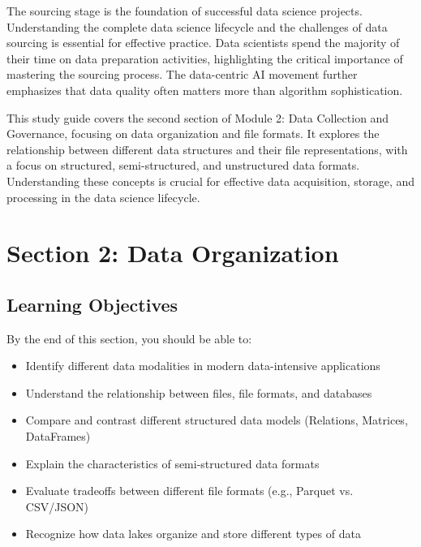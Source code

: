 \documentclass[12pt]{article}
\begin{document}
\begin{tcolorbox}[colback=red!5!white,colframe=red!75!black,title={Key Takeaway}]
The sourcing stage is the foundation of successful data science projects. Understanding the complete data science lifecycle and the challenges of data sourcing is essential for effective practice. Data scientists spend the majority of their time on data preparation activities, highlighting the critical importance of mastering the sourcing process. The data-centric AI movement further emphasizes that data quality often matters more than algorithm sophistication.
\end{tcolorbox}

\newpage

\begin{tcolorbox}[colback=blue!5!white,colframe=blue!75!black,title={Section 2: Data Organization}]
This study guide covers the second section of Module 2: Data Collection and Governance, focusing on data organization and file formats. It explores the relationship between different data structures and their file representations, with a focus on structured, semi-structured, and unstructured data formats. Understanding these concepts is crucial for effective data acquisition, storage, and processing in the data science lifecycle.
\end{tcolorbox}

\section{Section 2: Data Organization}

\subsection{Learning Objectives}

By the end of this section, you should be able to:

\begin{itemize}
    \item Identify different data modalities in modern data-intensive applications
    \item Understand the relationship between files, file formats, and databases
    \item Compare and contrast different structured data models (Relations, Matrices, DataFrames)
    \item Explain the characteristics of semi-structured data formats
    \item Evaluate tradeoffs between different file formats (e.g., Parquet vs. CSV/JSON)
    \item Recognize how data lakes organize and store different types of data
\end{itemize}
\end{document}
